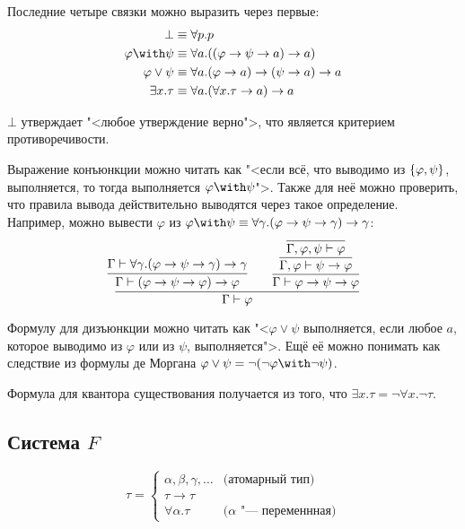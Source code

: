 Последние четыре связки можно выразить через первые:
\begin{align*}
    \bot & \equiv \forall p . p \\
    \varphi \with \psi & \equiv \forall a . ((\varphi \to \psi \to a) \to a) \\
    \varphi \vee \psi & \equiv \forall a . (\varphi \to a) \to (\psi \to a) \to a \\
    \exists x . \tau & \equiv \forall a . (\forall x . \tau \to a) \to a
\end{align*}

$\bot$ утверждает "<любое утверждение верно">, что является критерием противоречивости.

Выражение конъюнкции можно читать как "<если всё, что выводимо из $\left\{\varphi,\psi\right\}$, выполняется,
то тогда выполняется $\varphi\with\psi$">.
Также для неё можно проверить, что правила вывода действительно выводятся через такое определение.
Например, можно вывести $\varphi$ из $\varphi\with\psi\equiv\forall\gamma.(\varphi\to\psi\to\gamma)\to\gamma$:
\[
    \infer{\Gamma \vdash \varphi}
    {
        \infer{\Gamma \vdash (\varphi\to\psi\to\varphi)\to\varphi}
            {\Gamma \vdash \forall \gamma.(\varphi\to\psi\to\gamma)\to\gamma}
        &&
        \infer{\Gamma\vdash\varphi\to\psi\to\varphi}
        {\infer{\Gamma,\varphi\vdash\psi\to\varphi}
        {\infer{\Gamma,\varphi,\psi\vdash\varphi}
        {}}}
    }
\]

Формулу для дизъюнкции можно читать как "<$\varphi \vee \psi$ выполняется,
если любое $a$, которое выводимо из $\varphi$ или из $\psi$, выполняется">.
Ещё её можно понимать как следствие из формулы де Моргана $\varphi\vee\psi=\neg(\neg\varphi\with\neg\psi)$.

Формула для квантора существования получается из того, что $\exists x . \tau = \neg \forall x . \neg \tau$.

\subsection{\texorpdfstring{Система $F$}{System F}}
\begin{definition}
\[
    \tau =
    \begin{cases}
        \alpha, \beta, \gamma, \ldots & \text{(атомарный тип)} \\
        \tau \to \tau \\
        \forall \alpha . \tau & \text{($\alpha$ "--- переменнная)}
    \end{cases}
\]
\end{definition}


